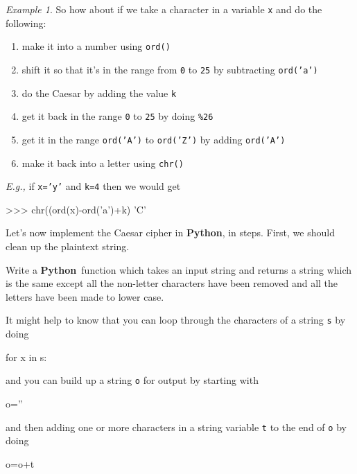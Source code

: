 \documentclass[12pt,letterpaper]{amsbook}
\theoremstyle{definition}
\theoremstyle{remark}
\newtheorem{example}[theorem]{Example}
\numberwithin{figure}{section}
\numberwithin{exercise}{chapter}
\numberwithin{section}{chapter}
\numberwithin{equation}{section}
\numberwithin{table}{subsection}
\newcommand{\code}[1]{\colorbox{lg}{\texttt{#1}}}
\newcommand{\Python}{{\textbf{\ix{Python}}}}
\newcommand{\ix}[1]{{#1}\index{#1}}
\begin{document}
\begin{example}
  So how about if we take a character in a variable \code{x} and do the
  following:
  \begin{enumerate}
  \item make it into a number using \code{ord()}
  \item shift it so that it's in the range from \code{0} to
    \code{25} by subtracting \code{ord('a')}
  \item do the Caesar by adding the value \code{k}
  \item get it back in the range \code{0} to \code{25} by doing
    \code{\%26}
  \item get it in the range \code{ord('A')} to \code{ord('Z')}
    by adding \code{ord('A')}
  \item make it back into a letter using \code{chr()}
  \end{enumerate}
  \textit{E.g.,} if \code{x='y'} and \code{k=4} then we would get\\
  \noindent\begin{codedisp}
    >>> chr((ord(x)-ord('a')+k)%
    'C'
  \end{codedisp}
\end{example}

Let's now implement the Caesar cipher in \Python, in steps.  First, we should
clean up the plaintext string.

\vskip2mm
\begin{CTtcb}[label=ct:cleanstring]{}{}
  Write a \Python\ function which takes an input string and returns a string
  which is the same except all the non-letter characters have been removed
  and all the letters have been made to lower case.
\end{CTtcb}

\vskip2mm
It might help to know that you can loop through the characters of a string
\code{s} by doing\\
\noindent\begin{codedisp}
  for x in s:
\end{codedisp}

\noindent and you can build up a string \code{o} for output by starting
with\\
\noindent\begin{codedisp}
  o=''
\end{codedisp}

\noindent and then adding one or more characters in a string variable
\code{t} to the end of \code{o} by doing\\
\noindent\begin{codedisp}
  o=o+t
\end{codedisp}
\end{document}
